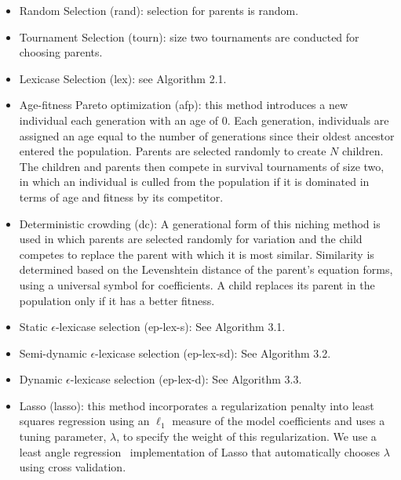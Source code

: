 \documentclass[twoside]{article}
\begin{document}
\begin{itemize}
\item Random Selection (rand): selection for parents is random.
\item Tournament Selection (tourn): size two tournaments are conducted for choosing parents. 
\item Lexicase Selection (lex): see Algorithm 2.1. 
\item Age-fitness Pareto optimization (afp): this method introduces a new individual each generation with an age of 0. Each generation, individuals are assigned an age equal to the number of generations since their oldest ancestor entered the population. Parents are selected randomly to create $N$ children. The children and parents then compete in survival tournaments of size two, in which an individual is culled from the population if it is dominated in terms of age and fitness by its competitor. 
\item Deterministic crowding (dc): A generational form of this niching method is used in which parents are selected randomly for variation and the child competes to replace the parent with which it is most similar. Similarity is determined based on the Levenshtein distance of the parent's equation forms, using a universal symbol for coefficients. A child replaces its parent in the population only if it has a better fitness.
\item Static $\epsilon$-lexicase selection (ep-lex-s): See Algorithm 3.1.
\item Semi-dynamic $\epsilon$-lexicase selection (ep-lex-sd): See Algorithm 3.2.
\item Dynamic $\epsilon$-lexicase selection (ep-lex-d): See Algorithm 3.3.
\item Lasso (lasso): this method incorporates a regularization penalty into least squares regression using an $\ell_1$ measure of the model coefficients and uses a tuning parameter, $\lambda$, to specify the weight of this regularization. We use a least angle regression~\citep{efron_least_2004} implementation of Lasso that automatically chooses $\lambda$ using cross validation.
\end{itemize} 
\end{document}
